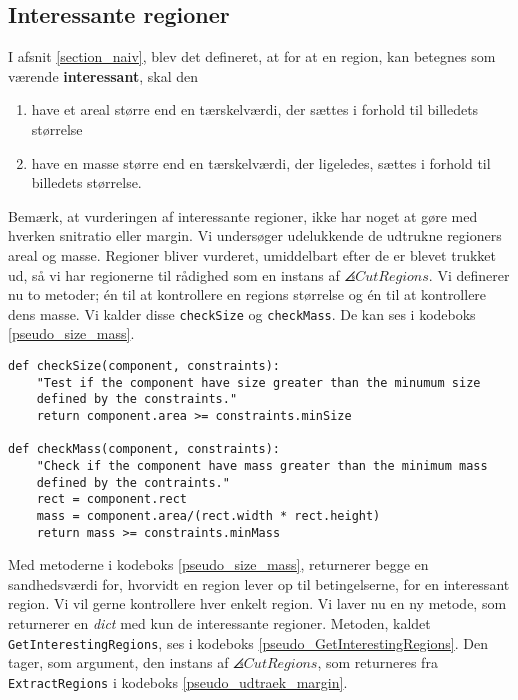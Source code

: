 {\subsection{Interessante regioner}
I afsnit \ref{section_naiv}, blev det defineret, at for at en region,
kan betegnes som værende \textbf{interessant}, skal den
\begin{enumerate}
        \renewcommand{\labelenumi}{(\alph{enumi})}
    \item have et areal større end en tærskelværdi, der sættes i
        forhold til billedets størrelse
    \item have en masse større end en tærskelværdi, der ligeledes,
        sættes i forhold til billedets størrelse.
\end{enumerate}
Bemærk, at vurderingen af interessante regioner, ikke har noget at gøre
med hverken snitratio eller margin. Vi undersøger udelukkende de
udtrukne regioners areal og masse. Regioner bliver vurderet, umiddelbart
efter de er blevet trukket ud, så vi har regionerne til rådighed som en
instans af $\angles{CutRegions}$. Vi definerer nu to metoder; én til at
kontrollere en regions størrelse og én til at kontrollere dens masse. Vi
kalder disse \texttt{checkSize} og \texttt{checkMass}. De kan ses i
kodeboks \ref{pseudo_size_mass}.

\begin{lstlisting}[caption={Metoder til at konstollere en regions
    størrelse og masse.},captionpos=b,label={pseudo_size_mass},
    frame=tb, breaklines=false, float=b]
def checkSize(component, constraints):
    "Test if the component have size greater than the minumum size
    defined by the constraints."
    return component.area >= constraints.minSize

def checkMass(component, constraints):
    "Check if the component have mass greater than the minimum mass
    defined by the contraints."
    rect = component.rect
    mass = component.area/(rect.width * rect.height)
    return mass >= constraints.minMass
\end{lstlisting}

Med metoderne i kodeboks \ref{pseudo_size_mass}, returnerer begge en
sandhedsværdi for, hvorvidt en region lever op til betingelserne, for en
interessant region. Vi vil gerne kontrollere hver enkelt region. Vi
laver nu en ny metode, som returnerer en \emph{dict} med kun de
interessante regioner.  Metoden, kaldet \texttt{GetInterestingRegions},
ses i kodeboks \ref{pseudo_GetInterestingRegions}. Den tager, som
argument, den instans af $\angles{CutRegions}$, som returneres fra
\texttt{ExtractRegions} i kodeboks \ref{pseudo_udtraek_margin}.

}

